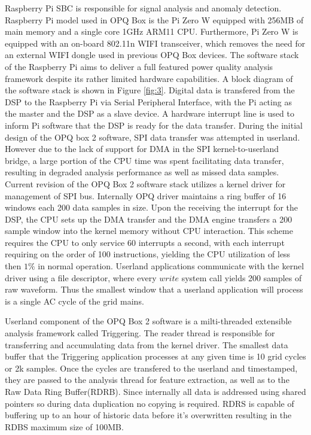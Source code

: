 Raspberry Pi SBC is responsible for signal analysis and anomaly detection. Raspberry Pi model used in OPQ Box is the Pi Zero W equipped with 256MB of main memory and a single core 1GHz ARM11 CPU. Furthermore, Pi Zero W is equipped with an on-board 802.11n WIFI transceiver, which removes the need for an external WIFI dongle used in previous OPQ Box devices. The software stack of the Raspberry Pi aims to deliver a full featured power quality analysis framework despite its rather limited hardware capabilities. A block diagram of the software stack is shown in Figure \ref{fig:3}. Digital data is transfered from the DSP to the Raspberry Pi via Serial Peripheral Interface, with the Pi acting as the master and the DSP as a slave device. A hardware interrupt line is used to inform Pi software that the DSP is ready for the data transfer. During the initial design of the OPQ box 2 software, SPI data transfer was attempted in userland. However due to the lack of support for DMA in the SPI kernel-to-userland bridge, a large portion of the CPU time was spent facilitating data transfer, resulting in degraded analysis performance as well as missed data samples. Current revision of the OPQ Box 2 software stack utilizes a kernel driver for management of SPI bus. Internally OPQ driver maintains a ring buffer of 16 windows each 200 data samples in size. Upon the receiving the interrupt for the DSP, the CPU sets up the DMA transfer and the DMA engine transfers a 200 sample window into the kernel memory without CPU interaction. This scheme requires the CPU to only service 60 interrupts a second, with each interrupt requiring on the order of 100 instructions, yielding the CPU utilization of less then $1\%$ in normal operation. Userland applications communicate with the kernel driver using a file descriptor, where every $write$ system call yields 200 samples of raw waveform. Thus the smallest window that a userland application will process is a single AC cycle of the grid mains.

Userland component of the OPQ Box 2 software is a milti-threaded extensible analysis framework called Triggering. The reader thread is responsible for transferring and accumulating data from the kernel driver. The smallest data buffer that the Triggering application processes at any given time is 10 grid cycles or 2k samples. Once the cycles are transfered to the userland and timestamped, they are passed to the analysis thread for feature extraction, as well as to the Raw Data Ring Buffer(RDRB). Since internally all data is addressed using shared pointers so during data duplication no copying is required. RDRS is capable of buffering up to an hour of historic data before it's overwritten resulting in the RDBS maximum size of 100MB. 

